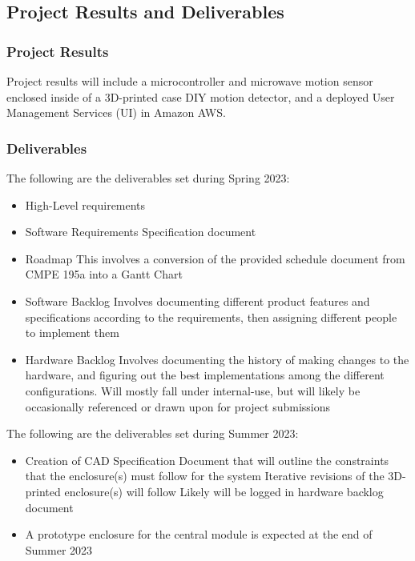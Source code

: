 \documentclass[conference]{IEEEtran}
\begin{document}
\subsection{Project Results and Deliverables}

\subsubsection{Project Results}

Project results will include a microcontroller and microwave motion sensor enclosed inside
of a 3D-printed case DIY motion detector, and a deployed User Management Services (UI)
in Amazon AWS.

\subsubsection{Deliverables}

The following are the deliverables set during Spring 2023:
\begin{itemize}
    \item High-Level requirements
    \item Software Requirements Specification document
    \item Roadmap
          \subitem This involves a conversion of the provided schedule document from
          CMPE 195a into a Gantt Chart
    \item Software Backlog
          \subitem Involves documenting different product features and specifications
          according to the requirements, then assigning different people to implement them
    \item Hardware Backlog
          \subitem Involves documenting the history of making changes to the hardware,
          and figuring out the best implementations among the different configurations.
          \subitem Will mostly fall under internal-use, but will likely be occasionally
          referenced or drawn upon for project submissions
\end{itemize}

The following are the deliverables set during Summer 2023:
\begin{itemize}
    \item Creation of CAD Specification Document that will outline the
          constraints that the enclosure(s) must follow for the system
          \subitem Iterative revisions of the 3D-printed enclosure(s) will follow
          \subsubitem Likely will be logged in hardware backlog document
    \item A prototype enclosure for the central module is expected at the end of Summer 2023
\end{itemize}
\end{document}

